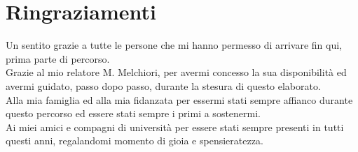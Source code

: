 \chapter*{Ringraziamenti}
Un sentito grazie a tutte le persone che mi hanno permesso di arrivare fin qui,
prima parte di percorso.\\
Grazie al mio relatore M. Melchiori, per avermi concesso la sua disponibilità ed
avermi guidato, passo dopo passo, durante la stesura di questo elaborato.\\
Alla mia famiglia ed alla mia fidanzata per essermi stati sempre affianco durante
questo percorso ed essere stati sempre i primi a sostenermi.\\
Ai miei amici e compagni di università per essere stati sempre presenti in tutti
questi anni, regalandomi momento di gioia e spensieratezza.


